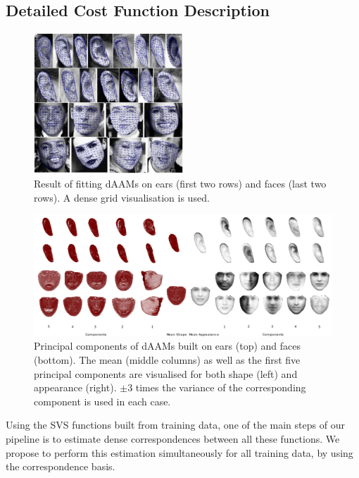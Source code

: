 \subsection{Detailed Cost Function Description}
\label{sec:cost_function}

\begin{figure}[!t]
\centering
\includegraphics[width=0.5\textwidth]{Suplementory_Meterial/Fittings/fittings}
\caption{Result of fitting dAAMs on ears (first two rows) and faces (last two rows). A dense grid visualisation is used.}
\label{fig:fr}
\end{figure}

\begin{figure}[!t]
\centering
\includegraphics[width=\textwidth]{Suplementory_Meterial/Models/models}
\caption{Principal components of dAAMs built on ears (top) and faces (bottom). The mean (middle columns) as well as the first five principal components are visualised for both shape (left) and appearance (right). $\pm 3$ times the variance of the corresponding component is used in each case.}
\label{fig:pcamodel}
\end{figure}

Using the SVS functions built from training data, one of the main steps of our pipeline is to estimate dense correspondences between all these functions. We propose to perform this estimation simultaneously for all training data, by using the correspondence basis.


